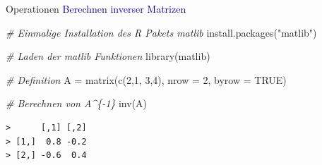 \documentclass[
  8pt,
  ignorenonframetext,
]{beamer}
\newenvironment{Shaded}{\begin{snugshade}}{\end{snugshade}}
\newcommand{\AttributeTok}[1]{\textcolor[rgb]{0.77,0.63,0.00}{#1}}
\newcommand{\CommentTok}[1]{\textcolor[rgb]{0.56,0.35,0.01}{\textit{#1}}}
\newcommand{\ConstantTok}[1]{\textcolor[rgb]{0.00,0.00,0.00}{#1}}
\newcommand{\DecValTok}[1]{\textcolor[rgb]{0.00,0.00,0.81}{#1}}
\newcommand{\FunctionTok}[1]{\textcolor[rgb]{0.00,0.00,0.00}{#1}}
\newcommand{\NormalTok}[1]{#1}
\newcommand{\OtherTok}[1]{\textcolor[rgb]{0.56,0.35,0.01}{#1}}
\newcommand{\StringTok}[1]{\textcolor[rgb]{0.31,0.60,0.02}{#1}}
\begin{document}
\begin{frame}[fragile]{Operationen}
\protect\hypertarget{operationen-27}{}
\textcolor{darkblue}{Berechnen inverser Matrizen} \footnotesize
\vspace{2mm} 

\begin{Shaded}
\begin{Highlighting}[]
\CommentTok{\# Einmalige Installation des R Pakets matlib}
\FunctionTok{install.packages}\NormalTok{(}\StringTok{"matlib"}\NormalTok{)}
\end{Highlighting}
\end{Shaded}

\vspace{2mm}

\begin{Shaded}
\begin{Highlighting}[]
\CommentTok{\# Laden der matlib Funktionen}
\FunctionTok{library}\NormalTok{(matlib)}

\CommentTok{\# Definition}
\NormalTok{A }\OtherTok{=} \FunctionTok{matrix}\NormalTok{(}\FunctionTok{c}\NormalTok{(}\DecValTok{2}\NormalTok{,}\DecValTok{1}\NormalTok{,}
             \DecValTok{3}\NormalTok{,}\DecValTok{4}\NormalTok{),}
           \AttributeTok{nrow  =} \DecValTok{2}\NormalTok{,}
           \AttributeTok{byrow =} \ConstantTok{TRUE}\NormalTok{)}

\CommentTok{\# Berechnen von A\^{}\{{-}1\}}
\FunctionTok{inv}\NormalTok{(A)}
\end{Highlighting}
\end{Shaded}

\begin{verbatim}
>      [,1] [,2]
> [1,]  0.8 -0.2
> [2,] -0.6  0.4
\end{verbatim}
\end{frame}
\end{document}

